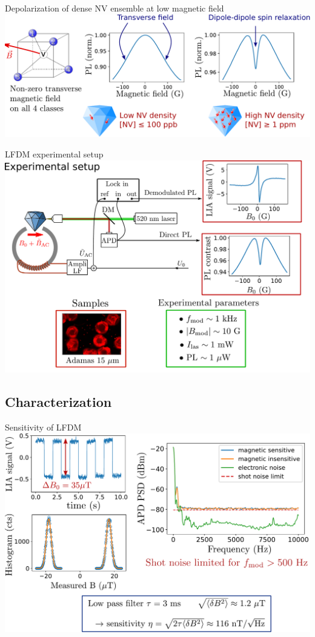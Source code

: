 \documentclass{beamer}
\begin{document}
\begin{frame}{Depolarization of dense NV ensemble at low magnetic field}
\centering
\includegraphics[width=\textwidth,height=0.85\textheight,keepaspectratio]{slide_presentation_sujet}
\end{frame}

\begin{frame}{LFDM experimental setup}
\centering
\includegraphics[width=\textwidth,height=0.85\textheight,keepaspectratio]{Slide_principle_LFDM}
\end{frame}

\subsection{Characterization}
\begin{frame}{Sensitivity of LFDM}
\centering
\includegraphics[width=\textwidth,height=0.85\textheight,keepaspectratio]{Slide_sensi_LFDM}
\end{frame}
\end{document}
